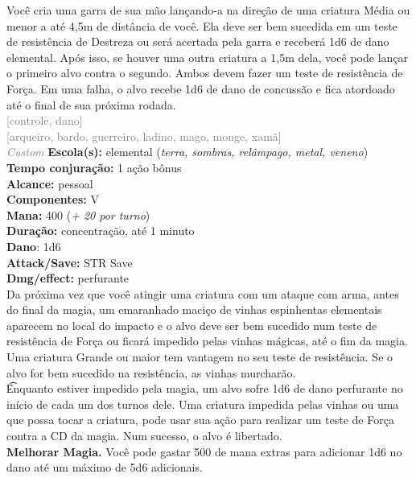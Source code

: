 \documentclass{RPG_Adventure}[2021/10/20]
\begin{document}
{\normalsize Você cria uma garra de sua mão lançando-a na direção de uma criatura Média ou menor a até 4,5m de distância de você. Ela deve ser bem sucedida em um teste de resistência de Destreza ou será acertada pela garra e receberá 1d6 de dano elemental. Após isso, se houver uma outra criatura a 1,5m dela, você pode lançar o primeiro alvo contra o segundo. Ambos devem fazer um teste de resistência de Força. Em uma falha, o alvo recebe 1d6 de dano de concussão e fica atordoado até o final de sua próxima rodada.\\}
{\scriptsize \textcolor{gray}{[controle, dano]\\}}
{\scriptsize \textcolor{gray}{[arqueiro, bardo, guerreiro, ladino, mago, monge, xamã]\\}}
{\tiny \textcolor{gray}{\textit{Custom}}}\jump{}
{\small \t \textbf{Escola(s):} elemental (\textit{terra, sombras, relâmpago, metal, veneno})\\\t \textbf{Tempo conjuração:} 1 ação bônus\\\t \textbf{Alcance:} pessoal\\\t \textbf{Componentes:} V\\\t \textbf{Mana:} 400 (\textit{+ 20 por turno})\\\t \textbf{Duração:} concentração, até 1 minuto\\\t \textbf{Dano}: 1d6\\\t \textbf{Attack/Save:} STR Save\\\t \textbf{Dmg/effect:} perfurante\\}
{\normalsize Da próxima vez que você atingir uma criatura com um ataque com arma, antes do final da magia, um emaranhado maciço de vinhas espinhentas elementais aparecem no local do impacto e o alvo deve ser bem sucedido num teste de resistência de Força ou ficará impedido pelas vinhas mágicas, até o fim da magia. Uma criatura Grande ou maior tem vantagem no seu teste de resistência. Se o alvo for bem sucedido na resistência, as vinhas murcharão.\\\t Enquanto estiver impedido pela magia, um alvo sofre 1d6 de dano perfurante no início de cada um dos turnos dele. Uma criatura impedida pelas vinhas ou uma que possa tocar a criatura, pode usar sua ação para realizar um teste de Força contra a CD da magia. Num sucesso, o alvo é libertado.\\\t \textbf{Melhorar Magia.} Você pode gastar 500 de mana extras para adicionar 1d6 no dano até um máximo de 5d6 adicionais.\\}
\end{document}
